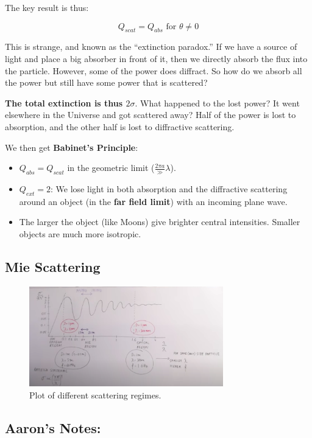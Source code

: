 \documentclass{article}
\begin{document}
The key result is thus:

$$
Q_{scat} = Q_{abs} \text{ for } \theta \neq 0
$$

This is strange, and known as the ``extinction paradox.'' If we have a source of light and place a big absorber in front of it, then we directly absorb the flux into the particle. However, some of the power does diffract. So how do we absorb all the power but still have some power that is scattered?

\textbf{The total extinction is thus $2\sigma$}. What happened to the lost power? It went elsewhere in the Universe and got scattered away? Half of the power is lost to absorption, and the other half is lost to diffractive scattering. 

We then get \textbf{Babinet's Principle}:
\begin{itemize}
    \item $Q_{abs} = Q_{scat}$ in the geometric limit ($\frac{2\pi a} \gg \lambda$).
    \item $Q_{ext} = 2$: We lose light in both absorption and the diffractive scattering around an object (in the \textbf{far field limit}) with an incoming plane wave. 
    \item The larger the object (like Moons) give brighter central intensities. Smaller objects are much more isotropic. 
\end{itemize}


\subsection{Mie Scattering}

\begin{figure}[h]
    \centering
    \includegraphics[width=0.75\textwidth]{figures/Screen Shot 2020-11-14 at 6.32.32 PM.png}
    \caption{Plot of different scattering regimes. }
    \label{fig:regis}
\end{figure}

\subsection{Aaron's Notes:}
\end{document}
